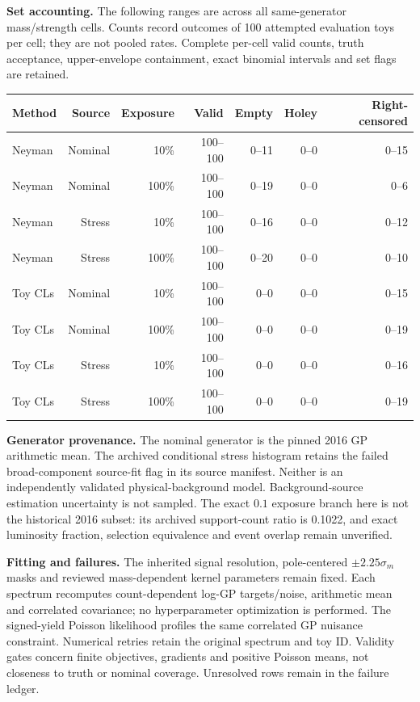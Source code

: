 \documentclass[10pt]{article}
\begin{document}
\textbf{Set accounting.} The following ranges are across all same-generator mass/strength cells. Counts record outcomes of 100 attempted evaluation toys per cell; they are not pooled rates. Complete per-cell valid counts, truth acceptance, upper-envelope containment, exact binomial intervals and set flags are retained.

\begin{center}\footnotesize\begin{tabular}{lrrrrrr}\toprule
Method & Source & Exposure & Valid & Empty & Holey & Right-censored\\\midrule
Neyman & Nominal & 10\% & 100--100 & 0--11 & 0--0 & 0--15\\
Neyman & Nominal & 100\% & 100--100 & 0--19 & 0--0 & 0--6\\
Neyman & Stress & 10\% & 100--100 & 0--16 & 0--0 & 0--12\\
Neyman & Stress & 100\% & 100--100 & 0--20 & 0--0 & 0--10\\
Toy CLs & Nominal & 10\% & 100--100 & 0--0 & 0--0 & 0--15\\
Toy CLs & Nominal & 100\% & 100--100 & 0--0 & 0--0 & 0--19\\
Toy CLs & Stress & 10\% & 100--100 & 0--0 & 0--0 & 0--16\\
Toy CLs & Stress & 100\% & 100--100 & 0--0 & 0--0 & 0--19\\
\bottomrule\end{tabular}\end{center}


\textbf{Generator provenance.} The nominal generator is the pinned 2016 GP arithmetic mean. The archived conditional stress histogram retains the failed broad-component source-fit flag in its source manifest. Neither is an independently validated physical-background model. Background-source estimation uncertainty is not sampled. The exact $0.1$ exposure branch here is not the historical 2016 subset: its archived support-count ratio is 0.1022, and exact luminosity fraction, selection equivalence and event overlap remain unverified.

\textbf{Fitting and failures.} The inherited signal resolution, pole-centered $\pm2.25\sigma_m$ masks and reviewed mass-dependent kernel parameters remain fixed. Each spectrum recomputes count-dependent log-GP targets/noise, arithmetic mean and correlated covariance; no hyperparameter optimization is performed. The signed-yield Poisson likelihood profiles the same correlated GP nuisance constraint. Numerical retries retain the original spectrum and toy ID. Validity gates concern finite objectives, gradients and positive Poisson means, not closeness to truth or nominal coverage. Unresolved rows remain in the failure ledger.
\end{document}
